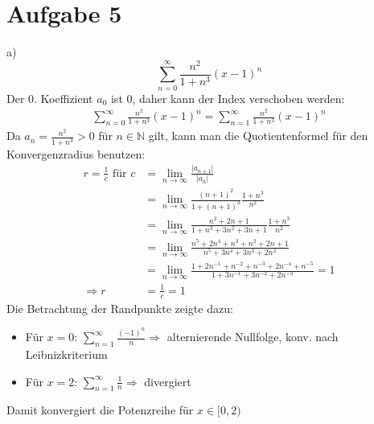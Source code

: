 \documentclass[a4paper]{article}
\begin{document}
\thispagestyle{fancy}
\section*{Aufgabe 5}
\par{a)}
\[
	\sum_{n=0}^\infty \frac{n^2}{1+n^3} (x-1)^n 
\]
Der 0. Koeffizient $a_0$ ist 0, daher kann der Index verschoben werden:
\begin{align*}
	\sum_{n=0}^\infty \frac{n^2}{1+n^3} (x-1)^n =
	\sum_{n=1}^\infty \frac{n^2}{1+n^3} (x-1)^n
\end{align*}
Da $a_n = \frac{n^2}{1+n^3}>0$ für $n\in\mathbb{N}$ gilt, kann man die
Quotientenformel für den Konvergenzradius benutzen:
\begin{align*}
	r = \frac 1 c \text{ für }
	c &= \lim_{n\rightarrow\infty}
	\frac{\vert a_{n+1} \vert}{\vert a_n \vert} \\
	&= \lim_{n\rightarrow\infty} 
	\frac{(n+1)^2}{1 + (n+1)^3}
	\frac{1 + n^3}{n^2} \\
	&= \lim_{n\rightarrow\infty} 
	\frac{n^2 + 2n + 1}{1 + n^3 + 3n^2 + 3n + 1}
	\frac{1+n^3}{n^2}\\
	&= \lim_{n\rightarrow\infty} 
	\frac{n^5 + 2n^4 + n^3 + n^2 + 2n + 1}
	{n^5 + 3n^4 + 3n^3 + 2n^2} \\
	&= \lim_{n\rightarrow\infty} 
	\frac{1 + 2n^{-1} + n^{-2} + n^{-3} + 2n^{-4}+ n^{-5}}
	{1 + 3n^{-1} + 3n^{-2} + 2n^{-3}} = 1 \\
	\Rightarrow
	r &= \frac1c = 1
\end{align*}
Die Betrachtung der Randpunkte zeigte dazu:
\begin{itemize}
	\item Für $x=0$:
		$ \sum_{n=1}^\infty \frac{(-1)^n}{n} 
		\Rightarrow$
		alternierende Nullfolge, konv. nach Leibnizkriterium
	\item Für $x=2$:
		$ \sum_{n=1}^\infty \frac{1}{n}
		\Rightarrow $
		divergiert
\end{itemize}
Damit konvergiert die Potenzreihe für $ x \in [0, 2)$
\end{document}
